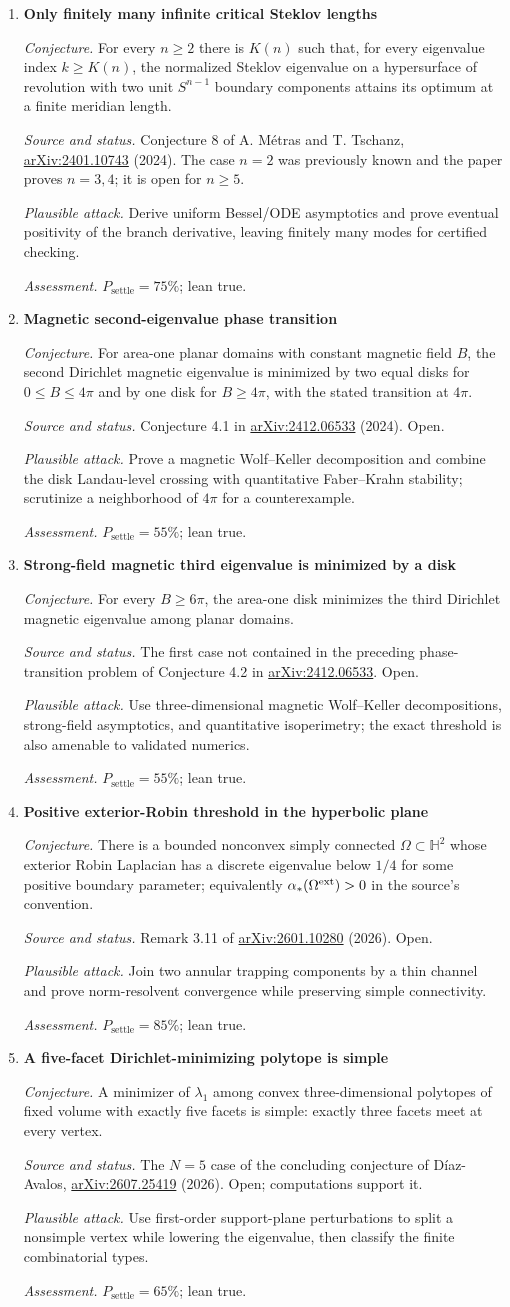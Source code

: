 \documentclass[11pt]{article}
\newcommand{\cand}[5]{%
  \item \textbf{#1}\par
  \emph{Conjecture.} #2\par
  \emph{Source and status.} #3\par
  \emph{Plausible attack.} #4\par
  \emph{Assessment.} #5
}
\newcommand{\psettle}{P_{\mathrm{settle}}}
\begin{document}
\begin{enumerate}[label=\textbf{L\arabic*.}]
\cand{Only finitely many infinite critical Steklov lengths}
{For every $n\ge2$ there is $K(n)$ such that, for every eigenvalue index $k\ge K(n)$, the normalized Steklov eigenvalue on a hypersurface of revolution with two unit $S^{n-1}$ boundary components attains its optimum at a finite meridian length.}
{Conjecture 8 of A. M\'etras and T. Tschanz, \href{https://arxiv.org/abs/2401.10743}{arXiv:2401.10743} (2024).  The case $n=2$ was previously known and the paper proves $n=3,4$; it is open for $n\ge5$.}
{Derive uniform Bessel/ODE asymptotics and prove eventual positivity of the branch derivative, leaving finitely many modes for certified checking.}
{$\psettle=75\%$; lean true.}

\cand{Magnetic second-eigenvalue phase transition}
{For area-one planar domains with constant magnetic field $B$, the second Dirichlet magnetic eigenvalue is minimized by two equal disks for $0\le B\le4\pi$ and by one disk for $B\ge4\pi$, with the stated transition at $4\pi$.}
{Conjecture 4.1 in \href{https://arxiv.org/abs/2412.06533}{arXiv:2412.06533} (2024).  Open.}
{Prove a magnetic Wolf--Keller decomposition and combine the disk Landau-level crossing with quantitative Faber--Krahn stability; scrutinize a neighborhood of $4\pi$ for a counterexample.}
{$\psettle=55\%$; lean true.}

\cand{Strong-field magnetic third eigenvalue is minimized by a disk}
{For every $B\ge6\pi$, the area-one disk minimizes the third Dirichlet magnetic eigenvalue among planar domains.}
{The first case not contained in the preceding phase-transition problem of Conjecture 4.2 in \href{https://arxiv.org/abs/2412.06533}{arXiv:2412.06533}.  Open.}
{Use three-dimensional magnetic Wolf--Keller decompositions, strong-field asymptotics, and quantitative isoperimetry; the exact threshold is also amenable to validated numerics.}
{$\psettle=55\%$; lean true.}

\cand{Positive exterior-Robin threshold in the hyperbolic plane}
{There is a bounded nonconvex simply connected $\Omega\subset\mathbb H^2$ whose exterior Robin Laplacian has a discrete eigenvalue below $1/4$ for some positive boundary parameter; equivalently $\alpha_*(\Omega^{\rm ext})>0$ in the source's convention.}
{Remark 3.11 of \href{https://arxiv.org/html/2601.10280}{arXiv:2601.10280} (2026).  Open.}
{Join two annular trapping components by a thin channel and prove norm-resolvent convergence while preserving simple connectivity.}
{$\psettle=85\%$; lean true.}

\cand{A five-facet Dirichlet-minimizing polytope is simple}
{A minimizer of $\lambda_1$ among convex three-dimensional polytopes of fixed volume with exactly five facets is simple: exactly three facets meet at every vertex.}
{The $N=5$ case of the concluding conjecture of D\'iaz-Avalos, \href{https://arxiv.org/abs/2607.25419}{arXiv:2607.25419} (2026).  Open; computations support it.}
{Use first-order support-plane perturbations to split a nonsimple vertex while lowering the eigenvalue, then classify the finite combinatorial types.}
{$\psettle=65\%$; lean true.}


\end{enumerate}
\end{document}
